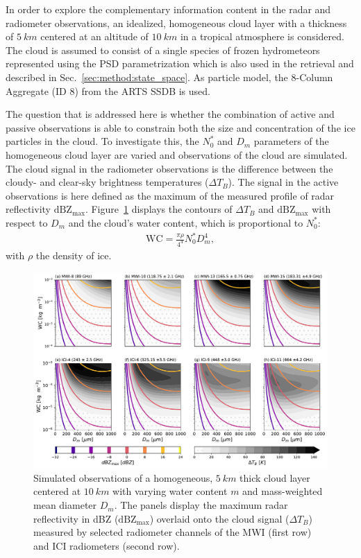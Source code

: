 \documentclass[journal abbreviation, manuscript]{copernicus}
\begin{document}
In order to explore the complementary information content in the radar and
radiometer observations, an idealized, homogeneous cloud layer with a thickness
of $5\ \unit{km}$ centered at an altitude of $10\ \unit{km}$ in a tropical
atmosphere is considered. The cloud is assumed to consist of a single species of
frozen hydrometeors represented using the PSD parametrization which is also used
in the retrieval and described in Sec.~\ref{sec:method:state_space}. As particle
model, the 8-Column Aggregate (ID 8) from the ARTS SSDB is used.

The question that is addressed here is whether the combination of active and
passive observations is able to constrain both the size and concentration of the
ice particles in the cloud. To investigate this, the $N_0^*$ and $D_m$
parameters of the homogeneous cloud layer are varied and observations of the
cloud are simulated. The cloud signal in the radiometer observations is the
difference between the cloudy- and clear-sky brightness temperatures ($\Delta
T_B$). The signal in the active observations is here defined as the maximum of
the measured profile of radar reflectivity $\text{dBZ}_\text{max}$.
Figure~\ref{fig:contours} displays the contours of $\Delta T_B$ and
$\text{dBZ}_\text{max}$ with respect to $D_m$ and the cloud's water content,
which is proportional to $N_0^*$:
\begin{align}
\text{WC} = \frac{\pi \rho}{4 ^ 4}N_0^* D_m^4,
\end{align}
with $\rho$ the density of ice.

\begin{figure}
\centering
\includegraphics[width = 1.0\textwidth]{../plots/contours}
\caption{Simulated observations of a homogeneous, $5\ \unit{km}$ thick cloud
  layer centered at $10\ \unit{km}$ with varying water content $m$ and
  mass-weighted mean diameter $D_m$. The panels display the maximum radar
  reflectivity in dBZ ($\text{dBZ}_\text{max}$) overlaid onto the cloud signal
  ($\Delta T_B$) measured by selected radiometer channels of the MWI (first row)
  and ICI radiometers (second row).}
\label{fig:contours}
\end{figure}
\end{document}
